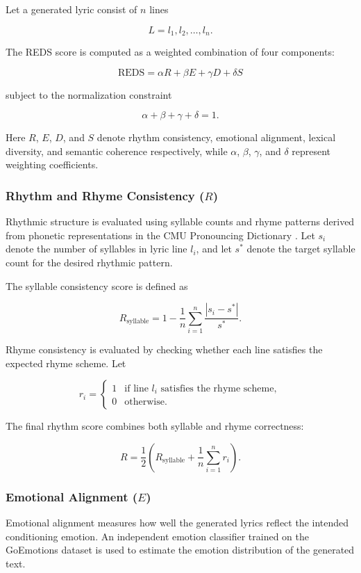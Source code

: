\documentclass[11pt]{article}
\begin{document}
Let a generated lyric consist of $n$ lines

\[
L = {l_1, l_2, \dots, l_n}.
\]

The REDS score is computed as a weighted combination of four components:

\[
\text{REDS} =
\alpha R + \beta E + \gamma D + \delta S
\]

subject to the normalization constraint

\[
\alpha + \beta + \gamma + \delta = 1.
\]

Here $R$, $E$, $D$, and $S$ denote rhythm consistency, emotional alignment, lexical diversity, and semantic coherence respectively, while $\alpha$, $\beta$, $\gamma$, and $\delta$ represent weighting coefficients.

\subsubsection{Rhythm and Rhyme Consistency ($R$)}

Rhythmic structure is evaluated using syllable counts and rhyme patterns derived from phonetic representations in the CMU Pronouncing Dictionary \cite{cmudict}. Let $s_i$ denote the number of syllables in lyric line $l_i$, and let $s^*$ denote the target syllable count for the desired rhythmic pattern.

The syllable consistency score is defined as

\[
R_{\text{syllable}} =
1 -
\frac{1}{n}
\sum_{i=1}^{n}
\frac{|s_i - s^*|}{s^*}.
\]

Rhyme consistency is evaluated by checking whether each line satisfies the expected rhyme scheme. Let

\[
r_i =
\begin{cases}
    1 & \text{if line } l_i \text{ satisfies the rhyme scheme}, \\
    0 & \text{otherwise}.
\end{cases}
\]

The final rhythm score combines both syllable and rhyme correctness:

\[
R =
\frac{1}{2}
\left(
R_{\text{syllable}}
+
\frac{1}{n}
\sum_{i=1}^{n} r_i
\right).
\]

\subsubsection{Emotional Alignment ($E$)}

Emotional alignment measures how well the generated lyrics reflect the intended conditioning emotion. An independent emotion classifier trained on the GoEmotions dataset \cite{demszky2020goemotions} is used to estimate the emotion distribution of the generated text.
\end{document}
